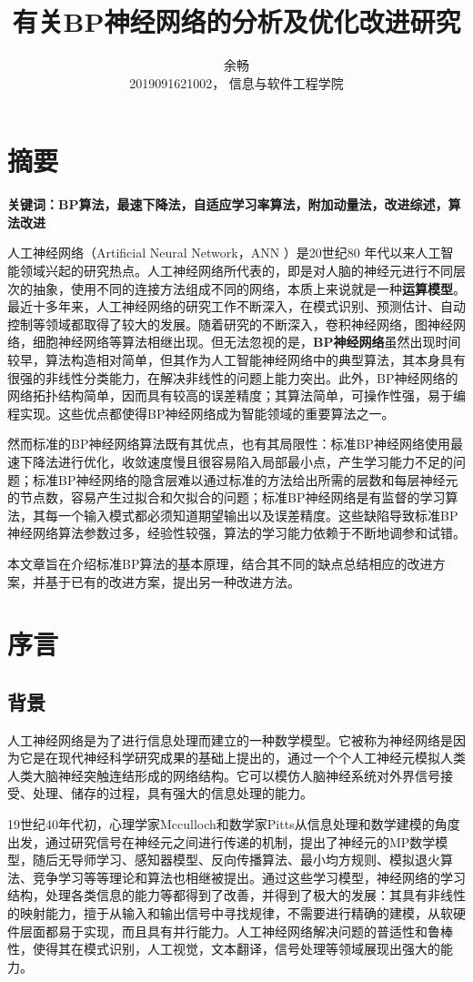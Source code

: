 \documentclass[UTF8]{ctexart}
\title{有关BP神经网络的分析及优化改进研究}
\author{余畅 \\ 2019091621002， 信息与软件工程学院}
\begin{document}
\maketitle

\section{摘要}
\textbf{关键词：BP算法，最速下降法，自适应学习率算法，附加动量法，改进综述，算法改进} \par
人工神经网络（Artificial Neural Network，ANN ）是20世纪80 年代以来人工智能领域兴起的研究热点。人工神经网络所代表的，即是对人脑的神经元进行不同层次的抽象，使用不同的连接方法组成不同的网络，本质上来说就是一种\textbf{运算模型}。最近十多年来，人工神经网络的研究工作不断深入，在模式识别、预测估计、自动控制等领域都取得了较大的发展。随着研究的不断深入，卷积神经网络，图神经网络，细胞神经网络等算法相继出现。但无法忽视的是，\textbf{BP神经网络}虽然出现时间较早，算法构造相对简单，但其作为人工智能神经网络中的典型算法，其本身具有很强的非线性分类能力，在解决非线性的问题上能力突出。此外，BP神经网络的网络拓扑结构简单，因而具有较高的误差精度；其算法简单，可操作性强，易于编程实现。这些优点都使得BP神经网络成为智能领域的重要算法之一。 \par
然而标准的BP神经网络算法既有其优点，也有其局限性：标准BP神经网络使用最速下降法进行优化，收敛速度慢且很容易陷入局部最小点，产生学习能力不足的问题；标准BP神经网络的隐含层难以通过标准的方法给出所需的层数和每层神经元的节点数，容易产生过拟合和欠拟合的问题；标准BP神经网络是有监督的学习算法，其每一个输入模式都必须知道期望输出以及误差精度。这些缺陷导致标准BP神经网络算法参数过多，经验性较强，算法的学习能力依赖于不断地调参和试错。 \par
本文章旨在介绍标准BP算法的基本原理，结合其不同的缺点总结相应的改进方案，并基于已有的改进方案，提出另一种改进方法。

\section{序言}
\subsection{背景}
人工神经网络是为了进行信息处理而建立的一种数学模型。它被称为神经网络是因为它是在现代神经科学研究成果的基础上提出的，通过一个个人工神经元模拟人类人类大脑神经突触连结形成的网络结构。它可以模仿人脑神经系统对外界信号接受、处理、储存的过程，具有强大的信息处理的能力。 \par
19世纪40年代初，心理学家Mcculloch和数学家Pitts从信息处理和数学建模的角度出发，通过研究信号在神经元之间进行传递的机制，提出了神经元的MP数学模型，随后无导师学习、感知器模型、反向传播算法、最小均方规则、模拟退火算法、竞争学习等等理论和算法也相继被提出。通过这些学习模型，神经网络的学习结构，处理各类信息的能力等都得到了改善，并得到了极大的发展：其具有非线性的映射能力，擅于从输入和输出信号中寻找规律，不需要进行精确的建模，从软硬件层面都易于实现，而且具有并行能力。人工神经网络解决问题的普适性和鲁棒性，使得其在模式识别，人工视觉，文本翻译，信号处理等领域展现出强大的能力。 \par
\end{document}
